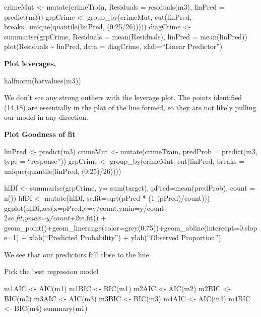 \documentclass[
]{article}
\begin{document}
crimeMut \textless- mutate(crimeTrain, Residuals = residuals(m3),
linPred = predict(m3)) grpCrime \textless- group\_by(crimeMut,
cut(linPred, breaks=unique(quantile(linPred, (0:25/26))))) diagCrime
\textless- summarise(grpCrime, Residuals = mean(Residuals), linPred =
mean(linPred)) plot(Residuals \textasciitilde{} linPred, data =
diagCrime, xlab=``Linear Predictor'')

\textbf{Plot leverages.}

halfnorm(hatvalues(m3))

We don't see any strong outliers with the leverage plot. The points
identified (14,18) are essentially in the plot of the line formed, so
they are not likely pulling our model in any direction.

\textbf{Plot Goodness of fit}

linPred \textless- predict(m3) crimeMut \textless- mutate(crimeTrain,
predProb = predict(m3, type = ``response'')) grpCrime \textless-
group\_by(crimeMut, cut(linPred, breaks = unique(quantile(linPred,
(0:25)/26))))

hlDf \textless- summarise(grpCrime, y= sum(target),
pPred=mean(predProb), count = n()) hlDf \textless- mutate(hlDf,
se.fit=sqrt(pPred * (1-(pPred)/count)))
ggplot(hlDf,aes(x=pPred,y=y/count,ymin=y/count-2\emph{se.fit,ymax=y/count+2}se.fit))
+
geom\_point()+geom\_linerange(color=grey(0.75))+geom\_abline(intercept=0,slope=1)
+ xlab(``Predicted Probability'') + ylab(``Observed Proportion'')

We see that our predictors fall close to the line.

Pick the best regression model

m1AIC \textless- AIC(m1) m1BIC \textless- BIC(m1) m2AIC \textless-
AIC(m2) m2BIC \textless- BIC(m2) m3AIC \textless- AIC(m3) m3BIC
\textless- BIC(m3) m4AIC \textless- AIC(m4) m4BIC \textless- BIC(m4)
summary(m1)
\end{document}
